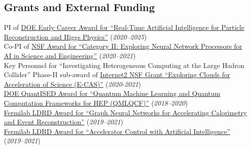 \documentclass[11pt]{res}
\newcommand{\MarginText}[1]{\section{#1}\vspace{10pt}}
\begin{document}
\begin{resume}
\MarginText{Grants and External Funding}
PI of \href{https://science.osti.gov/-/media/early-career/pdf/FY20_DOE_SC_Early_Career_Research_Program_Abstracts.pdf}{DOE Early Career Award for ``Real-Time Artificial Intelligence for Particle Reconstruction and Higgs Physics''} (\textit{2020--2025})\\
Co-PI of \href{https://nsf.gov/awardsearch/showAward?AWD_ID=2005369}{NSF Award for ``Category II: Exploring Neural Network Processors for AI in Science and Engineering''} (\textit{2020--2021})\\
Key Personnel for ``Investigating Heterogeneous Computing at the Large Hadron Collider'' Phase-II sub-award of \href{https://www.nsf.gov/awardsearch/showAward?AWD_ID=1904444}{Internet2 NSF Grant ``Exploring Clouds for Acceleration of Science (E-CAS)''} (\textit{2020-2021})\\
\href{https://pamspublic.science.energy.gov/WebPAMSExternal/Interface/Common/ViewPublicAbstract.aspx?rv=1f7d4729-6f93-40bd-a55f-c108545b1ea9&rtc=24&PRoleId=10}{DOE QuantISED Award for ``Quantum Machine Learning and Quantum Computation Frameworks for HEP (QMLQCF)''} (\textit{2018--2020})\\
\href{https://ldrd.fnal.gov/subdir/FNAL-LDRD-2019-017-D1.pdf}{Fermilab LDRD Award for ``Graph Neural Networks for Accelerating Calorimetry and Event Reconstruction''} (\textit{2019--2021})\\
\href{https://ldrd.fnal.gov/subdir/FNAL-LDRD-2019-027-D1.pdf}{Fermilab LDRD Award for ``Accelerator Control with Artificial Intelligence''} (\textit{2019--2021})\\



\end{resume}
\end{document}
